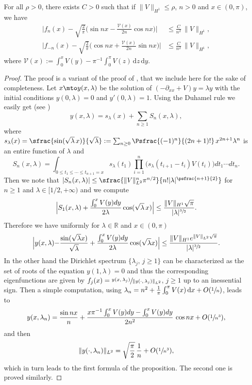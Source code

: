 \begin{proposition} \label{prop_desc_fn}
For all $\rho>0$, there exists $C>0$ such that if $\|V\|_{H^1}\leq \rho$, $n>0$ and $x\in (0,\pi)$, we have
\begin{align*}
\biggl|f_n(x)-\sqrt{\frac2\pi}\Big(\sin nx- \frac{\mathcal{V}(x)}{2n}\cos nx \Big)\biggr|&\leq \frac C{n^2}\,\|V\|_{H^1},
\\
\biggl|f_{-n}(x)-\sqrt{\frac2\pi}\Big(\cos nx+\frac{\mathcal{V}(x)}{2n}\sin nx \Big)\biggr|&\leq \frac C{n^2}\,\|V\|_{H^1},
\end{align*}
where $\mathcal{V}(x):= \int_0^x V(y) - \pi^{-1}\int_0^\pi V(z) \,\mathrm{d}z\, \mathrm{d}y$.
\end{proposition}
\begin{proof}
The proof is a variant of the proof of \cite[Th.\,4, p.\,16]{PT}, that we include here for the sake of completeness. Let $x\mto y(x,\lambda)$ be the solution of $(-\partial_{xx}+V)y=\lambda y$ with the initial conditions $y(0,\lambda)=0$ and $y'(0,\lambda)=1$.
Using the Duhamel rule we easily get (see \cite[Th.\,1, p.\,7]{PT})
\[
y(x,\lambda)=s_\lambda(x)+\sum_{n\geq1}S_n(x,\lambda),
\]
where $s_\lambda(x)=\sfrac{\sin(\sqrt\lambda\, x)}{\sqrt \lambda}:=\sum_{n\geq0}\Psfrac{(-1)^n}{(2n+1)!}\,x^{2n+1}\lambda^n$ is an entire function of $\lambda$ and
\[
S_n(x,\lambda)=\int_{0\leq t_1\leq\cdots\leq t_{n+1}=x}s_\lambda(t_1)\prod_{i=1}^n\big(s_\lambda(t_{i+1}-t_i)V(t_i)\big)dt_1\cdots dt_n.
\]
Then we note that $ |S_n(x,\lambda)|\leq \sfrac{\|V\|^n_{L^2} { \pi^{n/2} }}{n!|\lambda|^{\psfrac{n+1}{2}}}$ for $n\geq 1$ {and $\lambda\in[1/2,+\infty)$}
and we compute
\[
\Bigl|S_1(x,\lambda)+\frac{ \int_0^x V(y)dy}{2\lambda}\cos(\sqrt\lambda\, x)\Bigr|\leq \frac{\|V\|_{H^1}\sqrt\pi}{|\lambda|^{\sfrac32}}.
\]
Therefore we have uniformly for $\lambda\in\mathbb R$ and $x\in(0,\pi)$
\[
\Bigl|y(x,\lambda){ -\frac{\sin(\sqrt{\lambda} x)}{\sqrt{\lambda}} }+ \frac{ \int_0^x V(y)dy}{2\lambda}\cos (\sqrt\lambda x)\Bigr|\leq \frac{\|V\|_{H^1}e^{\|V\|_{L^2} { \sqrt{\pi} } }}{|\lambda|^{\sfrac32}}.
\]
In the other hand the Dirichlet spectrum $\{\lambda_j,\, j\geq1\}$ can be characterized as the set of roots of the equation $y(1,\lambda)=0$ and thus
the corresponding eigenfunctions are given by $f_j(x)=\sfrac{y(x,\lambda_j)}{\|y(\cdot,\lambda_j)\|_{L^2}}$, $j\geq1$ up to an inessential sign. Then a simple computation, using $\lambda_n = n^2 + \frac1\pi \int_{0}^{\pi} V(x)\, \mathrm{d}x + O(\sfrac1n)$, leads to
\[
y(x,\lambda_n)=\frac{\sin nx}{n}+ \frac{x\pi^{-1}\int_0^x V(y)dy-\int_0^x V(y)dy}{2n^2}\,\cos nx+O(\sfrac 1{n^3}),
\]
and then
\[
\|y(\cdot,\lambda_n)\|_{L^2}= \sqrt{\frac\pi 2}\,\frac1n+O(\sfrac1{n^3}),
\]
which in turn leads to the first formula of the proposition. The second one is proved similarly.
\end{proof}

